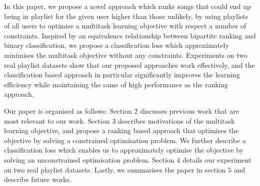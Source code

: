 In this paper, we propose a novel approach which ranks songs that could end up being in playlist for the 
given user higher than those unlikely, by using playlists of all users to optimise a multitask learning 
objective with respect a number of constraints.
Inspired by an equivalence relationship between bipartite ranking and binary classification,
we propose a classification loss which approximately minimises the multitask objective without 
any constraints.
Experiments on two real playlist datasets show that our proposed approaches work effectively,
and the classification based approach in particular significantly improves the learning efficiency 
while maintaining the same of high performance as the ranking approach.

Our paper is organised as follows:
Section 2 discusses previous work that are most relevant to our work.
Section 3 describes motivations of the multitask learning objective, and propose a ranking based approach 
that optimises the objective by solving a constrained optimisation problem.
We further describe a classification loss which enables us to approximately optimise the objective by
solving an unconstrained optimisation problem.
Section 4 details our experiment on two real playlist datasets.
Lastly, we summarises the paper in section 5 and describe future works.
